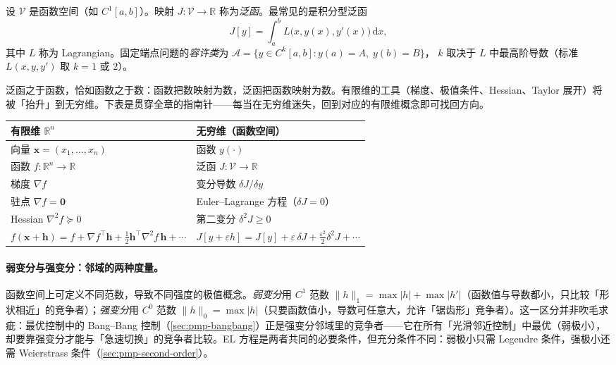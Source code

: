 \begin{definition}[泛函与容许类]\label{def:pmp-functional}
设 $\mathcal V$ 是函数空间（如 $C^1[a,b]$）。映射 $J:\mathcal V\to\mathbb R$ 称为\emph{泛函}。最常见的是积分型泛函
\begin{equation}
  J[y]=\int_a^b L\big(x,y(x),y'(x)\big)\,\mathrm dx,
  \label{eq:pmp-integral-functional}
\end{equation}
其中 $L$ 称为 Lagrangian。固定端点问题的\emph{容许类}为
$\mathcal A=\{y\in C^k[a,b]:y(a)=A,\;y(b)=B\}$，
$k$ 取决于 $L$ 中最高阶导数（标准 $L(x,y,y')$ 取 $k=1$ 或 $2$）。
\end{definition}

\begin{insight}
泛函之于函数，恰如函数之于数：函数把数映射为数，泛函把函数映射为数。有限维的工具（梯度、极值条件、Hessian、Taylor 展开）将被「抬升」到无穷维。下表是贯穿全章的指南针——每当在无穷维迷失，回到对应的有限维概念即可找回方向。

\begin{center}\small
\begin{tabular}{ll}
\toprule
有限维 $\mathbb R^n$ & 无穷维（函数空间）\\
\midrule
向量 $\mathbf x=(x_1,\dots,x_n)$ & 函数 $y(\cdot)$\\
函数 $f:\mathbb R^n\to\mathbb R$ & 泛函 $J:\mathcal V\to\mathbb R$\\
梯度 $\nabla f$ & 变分导数 $\delta J/\delta y$\\
驻点 $\nabla f=\mathbf 0$ & Euler--Lagrange 方程（$\delta J=0$）\\
Hessian $\nabla^2 f\succeq 0$ & 第二变分 $\delta^2 J\ge 0$\\
$f(\mathbf x+\mathbf h)=f+\nabla f^\top\mathbf h+\tfrac12\mathbf h^\top\nabla^2 f\,\mathbf h+\cdots$ & $J[y+\varepsilon h]=J[y]+\varepsilon\,\delta J+\tfrac{\varepsilon^2}{2}\delta^2 J+\cdots$\\
\bottomrule
\end{tabular}
\end{center}
\end{insight}

\paragraph{弱变分与强变分：邻域的两种度量。}
函数空间上可定义不同范数，导致不同强度的极值概念。\emph{弱变分}用 $C^1$ 范数 $\|h\|_1=\max|h|+\max|h'|$（函数值与导数都小，只比较「形状相近」的竞争者）；\emph{强变分}用 $C^0$ 范数 $\|h\|_0=\max|h|$（只要函数值小，导数可任意大，允许「锯齿形」竞争者）。这一区分并非吹毛求疵：最优控制中的 Bang--Bang 控制（\cref{sec:pmp-bangbang}）正是强变分邻域里的竞争者——它在所有「光滑邻近控制」中最优（弱极小），却要靠强变分才能与「急速切换」的竞争者比较。EL 方程是两者共同的必要条件，但充分条件不同：弱极小只需 Legendre 条件，强极小还需 Weierstrass 条件（\cref{sec:pmp-second-order}）。

